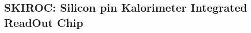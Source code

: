 \documentclass[final,3p,times,twocolumn]{elsarticle}
\newcommand{\todo}[1]{\textcolor{red}{{#1}}}
\begin{document}




\subsection{SKIROC: Silicon pin Kalorimeter Integrated ReadOut Chip}
\label{sec:skiroc}
\end{document}
